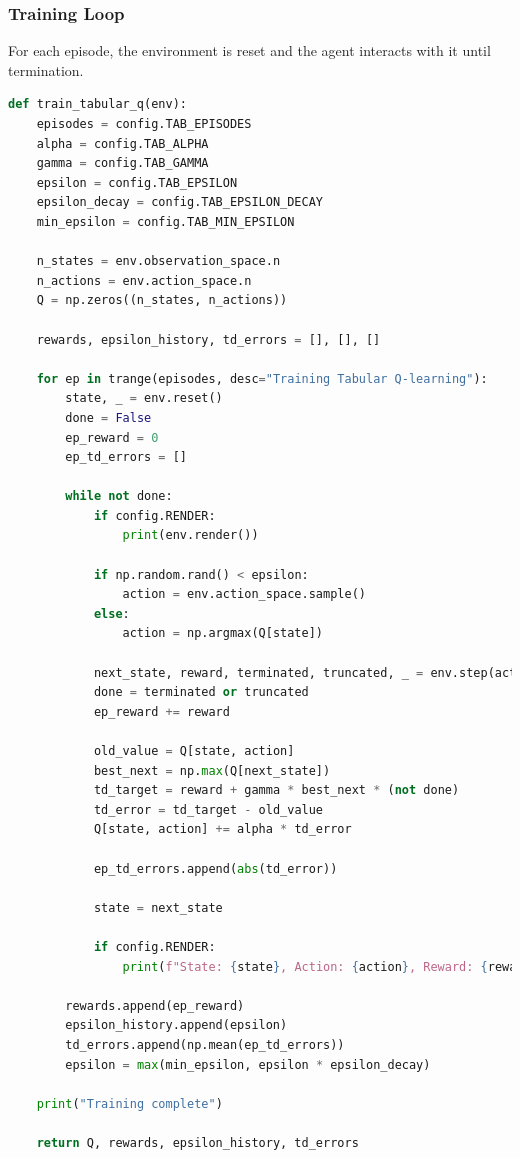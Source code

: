\documentclass[a4paper,12pt]{article}
\begin{document}
\subsubsection{Training Loop}
For each episode, the environment is reset and the agent interacts with it until termination.
\begin{lstlisting}[language=Python]
def train_tabular_q(env):
    episodes = config.TAB_EPISODES
    alpha = config.TAB_ALPHA
    gamma = config.TAB_GAMMA
    epsilon = config.TAB_EPSILON
    epsilon_decay = config.TAB_EPSILON_DECAY
    min_epsilon = config.TAB_MIN_EPSILON

    n_states = env.observation_space.n
    n_actions = env.action_space.n
    Q = np.zeros((n_states, n_actions))

    rewards, epsilon_history, td_errors = [], [], []

    for ep in trange(episodes, desc="Training Tabular Q-learning"):
        state, _ = env.reset()
        done = False
        ep_reward = 0
        ep_td_errors = []

        while not done:
            if config.RENDER:
                print(env.render())

            if np.random.rand() < epsilon:
                action = env.action_space.sample()
            else:
                action = np.argmax(Q[state])

            next_state, reward, terminated, truncated, _ = env.step(action)
            done = terminated or truncated
            ep_reward += reward

            old_value = Q[state, action]
            best_next = np.max(Q[next_state])
            td_target = reward + gamma * best_next * (not done)
            td_error = td_target - old_value
            Q[state, action] += alpha * td_error

            ep_td_errors.append(abs(td_error))

            state = next_state

            if config.RENDER:
                print(f"State: {state}, Action: {action}, Reward: {reward}, Next state: {next_state}\n---\n")

        rewards.append(ep_reward)
        epsilon_history.append(epsilon)
        td_errors.append(np.mean(ep_td_errors))
        epsilon = max(min_epsilon, epsilon * epsilon_decay)

    print("Training complete")

    return Q, rewards, epsilon_history, td_errors
\end{lstlisting}
\end{document}
